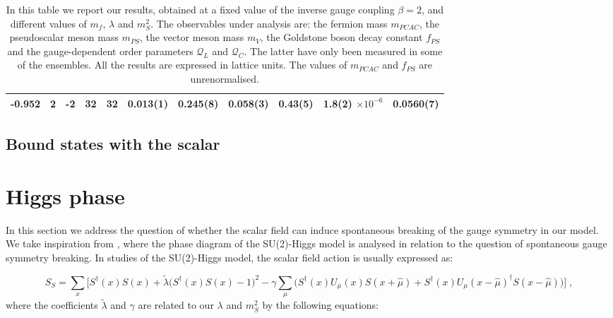 \begin{table}
\begin{adjustwidth}{-4em}{-4em}
\begin{tabular}{l  l l l l l l l l l l}
-0.952 & 2 & -2 & 32 & 32  & 0.013(1) & 0.245(8) & 0.058(3) & 0.43(5) & 1.8(2) $\times 10^{-6}$ & 0.0560(7)\\
\bottomrule
\end{tabular}
\end{adjustwidth}
\caption{In this table we report our results, obtained at a fixed value of the inverse gauge coupling $\beta = 2$, and different values of $m_f$, $\lambda$ and $m_S^2$. The observables under analysis are: the fermion mass $m_{PCAC}$, the pseudoscalar meson mass $m_{PS}$, the vector meson mass $m_V$, the Goldstone boson decay constant $f_{PS}$ and the gauge-dependent order parameters $\mathcal Q_L$ and $\mathcal Q_C$. The latter have only been measured in some of the ensembles. All the results are expressed in lattice units. The values of $m_{PCAC}$ and $f_{PS}$ are unrenormalised.}
\label{data}
\end{table}



\subsection{Bound states with the scalar}





\section{Higgs phase}

In this section we address the question of whether the scalar field can induce spontaneous breaking of the gauge symmetry in our model. We take inspiration from \cite{Caudy:2007sf}, where the phase diagram of the SU(2)-Higgs model is analysed in relation to the question of spontaneous gauge symmetry breaking. In studies of the SU(2)-Higgs model, the scalar field action is usually expressed as:

\begin{equation}
S_S =  \sum_x \biggl[ S^{\dagger}(x) S(x) + \tilde \lambda \bigl( S^{\dagger}(x) S(x) - 1 \bigr)^2 
 - \gamma\sum_{\mu}   \biggl( S^{\dagger}(x) U_{\mu}(x) S(x+\hat\mu) +  S^{\dagger}(x) U_{\mu}(x-\hat\mu)^{\dagger} S(x-\hat\mu)\biggr)  \biggr] \; ,
\end{equation}
%
where the coefficients $\tilde \lambda$ and $\gamma$ are related to our $\lambda$ and $m_S^2$ by the following equations:

